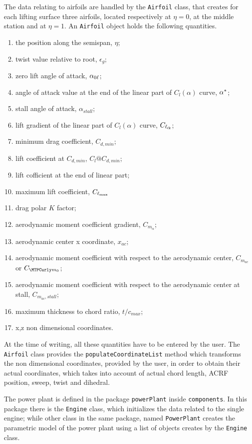 \bigskip
\noindent
The data relating to airfoils are handled by the \lstinline[language=Java]!Airfoil! class, that creates for each lifting surface three airfoils, located respectively at $\eta=0$, at the middle station and at $\eta=1$. An \lstinline[language=Java]!Airfoil! object holds the following quantities.
%
\begin{enumerate}
	\item the position along the semispan, $\eta$;
	\item twist value relative to root, $\epsilon_g$;
	\item zero lift angle of attack, $\alpha_{{0\ell}}$;
	\item angle of attack value at the end of the linear part of $C_l(\alpha)$ curve, $\alpha^*$;
	\item stall angle of attack, $\alpha_{stall}$;
	\item lift gradient of the linear part of $C_l(\alpha)$ curve, $\Clalphap$;
	\item minimum drag coefficient, $C_{d,min}$;
	\item lift coefficient at $C_{d,min}$, $C_l@C_{d,min}$;
	\item lift cofficient at the end of linear part;
	\item maximum lift coefficient, $C_{\ell_{\text{max}}}$
	\item drag polar $K$ factor;
	\item aerodynamic moment coefficient gradient, $C_{m_\alpha}$;
	\item aerodynamic center x coordinate, $x_{ac}$;
	\item aerodynamic moment coefficient with respect to the aerodynamic center, $C_{m_{ac}}$ or $\Cmzerop$;
	\item aerodynamic moment coefficient with respect to the aerodynamic center at stall, $C_{m_{ac},stall}$;
	\item maximum thickness to chord ratio, $t/c_{max}$;
	\item x,z non dimensional coordinates.
\end{enumerate}
%
At the time of writing, all these quantities have to be entered by the user. The \lstinline[language=Java]!Airfoil! class provides the \lstinline[language=Java]!populateCoordinateList! method which transforms the non dimensional coordinates, provided by the user, in order to obtain their actual coordinates, which takes into account of actual chord length, \gls{ACRF} position, sweep, twist and dihedral.

\bigskip
\noindent
The power plant is defined in the package \lstinline[language=Java]!powerPlant! inside \lstinline[language=Java]!components!. In this package there is the \lstinline[language=Java]!Engine! class, which initializes the data related to the single engine; while other class in the same package, named \lstinline[language=Java]!PowerPlant! creates the parametric model of the power plant using a list of objects creates by the \lstinline[language=Java]!Engine! class.
%
